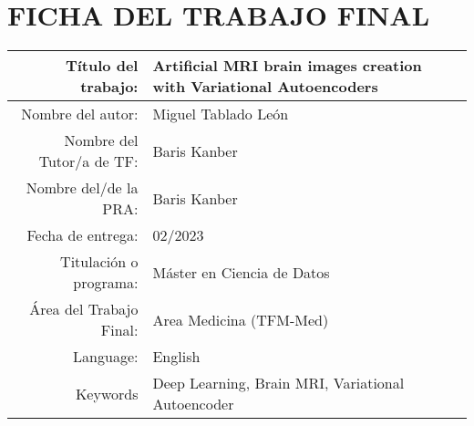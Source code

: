 \documentclass[11pt,a4paper,openany]{book}
\begin{document}




\setcounter{page}{1} 
\pagestyle{plain}

\chapter*{FICHA DEL TRABAJO FINAL}
\begin{table}[ht]
	\centering{}
	\renewcommand{\arraystretch}{2}
	\begin{tabular}{r | l}
		\hline
		Título del trabajo: & Artificial MRI brain images creation with Variational Autoencoders\\
		\hline
        Nombre del autor: & Miguel Tablado León\\
		\hline
        Nombre del Tutor/a de TF: & Baris Kanber\\
		\hline
        Nombre del/de la PRA: & Baris Kanber\\
		\hline
        Fecha de entrega: & 02/2023\\
		\hline
        Titulación o programa: & Máster en Ciencia de Datos\\
		\hline
        Área del Trabajo Final: & Area Medicina (TFM-Med)\\
		\hline
        Language: & English\\
		\hline
        Keywords & Deep Learning, Brain MRI, Variational Autoencoder\\
		\hline
	\end{tabular}
\end{table}
\end{document}

